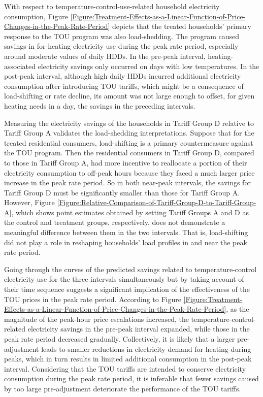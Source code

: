 With respect to temperature-control-use-related household electricity consumption, Figure \ref{Figure:Treatment-Effects-as-a-Linear-Function-of-Price-Changes-in-the-Peak-Rate-Period} depicts that the treated households' primary response to the TOU program was also load-shedding. The program caused savings in for-heating electricity use during the peak rate period, especially around moderate values of daily HDDs. In the pre-peak interval, heating-associated electricity savings only occurred on days with low temperatures. In the post-peak interval, although high daily HDDs incurred additional electricity consumption after introducing TOU tariffs, which might be a consequence of load-shifting or rate decline, its amount was not large enough to offset, for given heating needs in a day, the savings in the preceding intervals.

Measuring the electricity savings of the households in Tariff Group D relative to Tariff Group A validates the load-shedding interpretations. Suppose that for the treated residential consumers, load-shifting is a primary countermeasure against the TOU program. Then the residential consumers in Tariff Group D, compared to those in Tariff Group A, had more incentive to reallocate a portion of their electricity consumption to off-peak hours because they faced a much larger price increase in the peak rate period. So in both near-peak intervals, the savings for Tariff Group D must be significantly smaller than those for Tariff Group A. However, Figure \ref{Figure:Relative-Comparison-of-Tariff-Group-D-to-Tariff-Group-A}, which shows point estimates obtained by setting Tariff Groups A and D as the control and treatment groups, respectively, does not demonstrate a meaningful difference between them in the two intervals. That is, load-shifting did not play a role in reshaping households' load profiles in and near the peak rate period. 

Going through the curves of the predicted savings related to temperature-control electricity use for the three intervals simultaneously but by taking account of their time sequence suggests a significant implication of the effectiveness of the TOU prices in the peak rate period. According to Figure \ref{Figure:Treatment-Effects-as-a-Linear-Function-of-Price-Changes-in-the-Peak-Rate-Period}, as the magnitude of the peak-hour price escalations increased, the temperature-control-related electricity savings in the pre-peak interval expanded, while those in the peak rate period decreased gradually. Collectively, it is likely that a larger pre-adjustment leads to smaller reductions in electricity demand for heating during peaks, which in turn results in limited additional consumption in the post-peak interval. Considering that the TOU tariffs are intended to conserve electricity consumption during the peak rate period, it is inferable that fewer savings caused by too large pre-adjustment deteriorate the performance of the TOU tariffs.  

